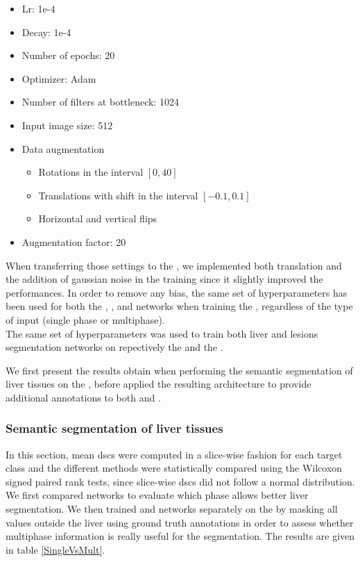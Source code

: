 \begin{itemize}
	\item Lr: 1e-4
	\item Decay: 1e-4
	\item Number of epochs: 20
	\item Optimizer: Adam
	\item Number of filters at bottleneck: 1024
	\item Input image size: 512
	\item Data augmentation
	\begin{itemize}
		\item Rotations in the interval $ \left[0, 40\right] $
		\item Translations with shift in the interval $ \left[-0.1, 0.1\right] $
		\item Horizontal and vertical flips
	\end{itemize}
	\item Augmentation factor: 20
\end{itemize}

When transferring those settings to the \textbf{}, 
we implemented both translation and the addition of gaussian
noise in the training since it slightly improved the performances.
In order to remove any bias, the same set of hyperparameters has been
used for both the , ,  and
 networks when training the \textbf{}, regardless of the
type of input (single phase or multiphase). \\
The same set of hyperparameters was used to train both liver and lesions segmentation networks on repectively the \textbf{} and the \textbf{}.

We first present the results obtain when performing the semantic segmentation of liver tissues on the \textbf{}, before applied the resulting architecture to provide additional annotations to both \textbf{} and \textbf{}.


\subsubsection{Semantic segmentation of liver tissues}

In this section, mean \ac{dsc}s were computed in a slice-wise fashion for each target class and the different methods were statistically compared using the Wilcoxon 
signed paired rank tests, since slice-wise \ac{dsc}s did not follow a normal distribution. 
We first compared  networks
 to evaluate which phase allows better liver segmentation. 
 We then trained  and   networks separately on the \textbf{} by masking all values outside the liver using ground truth annotations in order to assess whether multiphase information is really useful for the segmentation. The results are given in table \ref{SingleVsMult}.

